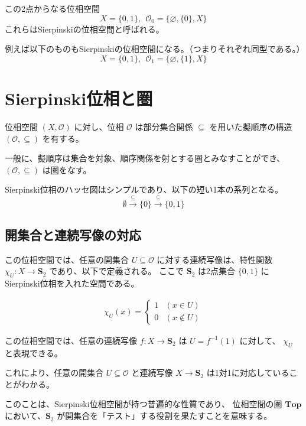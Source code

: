 \documentclass[uplatex,a4j,12pt,dvipdfmx]{jsarticle}
\begin{document}
この2点からなる位相空間
$$X = \{0, 1\} , \  \ \mathcal{O}_{0} = \{\varnothing, \{0\}, X\}$$
これらはSierpinskiの位相空間と呼ばれる。

例えば以下のものもSierpinskiの位相空間になる。（つまりそれぞれ同型である。）
$$X = \{0, 1\} , \  \ \mathcal{O}_{1} = \{\varnothing, \{1\}, X\}$$



\section{Sierpinski位相と圏}

位相空間 $(X, \mathcal{O})$ に対し、位相 $\mathcal{O}$ は部分集合関係 $\subseteq$ を用いた擬順序の構造 $(\mathcal{O}, \subseteq )$ を有する。

一般に、擬順序は集合を対象、順序関係を射とする圏とみなすことができ、$ (\mathcal{O}, \subseteq ) $ は圏をなす。

Sierpinski位相のハッセ図はシンプルであり、以下の短い1本の系列となる。
$$
	\emptyset \xrightarrow{\subseteq} \{0\} \xrightarrow{\subseteq} \{0, 1\}
$$

\subsection{開集合と連続写像の対応}

この位相空間では、任意の開集合 $U \subseteq \mathcal{O}$ に対する連続写像は、特性関数$\chi_{U}: X \to \mathbf{S}_ {2}$ であり、以下で定義される。
ここで $\mathbf{S}_ {2}$ は2点集合 $\{0,1\}$ にSierpinski位相を入れた空間である。

\begin{align*}
	\chi_{U}(x) =
	\begin{cases}
		1 & (x \in U)    \\
		0 & (x \notin U)
	\end{cases}
\end{align*}

この位相空間では、任意の連続写像 $f: X \to \mathbf{S}_ {2}$ は $U = f^{-1}(1)$ に対して、 $\chi_{U}$ と表現できる。

これにより、任意の開集合 $U \subseteq \mathcal{O}$ と連続写像 $X \to \mathbf{S}_ {2}$ は1対1に対応していることがわかる。

このことは、Sierpinski位相空間が持つ普遍的な性質であり、
位相空間の圏 $\mathbf{Top}$ において、$\mathbf{S}_ {2}$ が開集合を「テスト」する役割を果たすことを意味する。
\end{document}
